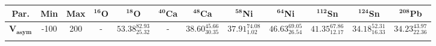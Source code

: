 \bgroup
\def\arraystretch{1.5}%
\begin{tabular}{ c c c c c c c c c c c c} 
\textbf{Par.} & \textbf{Min} & \textbf{Max} & \textbf{$\mathbf{^{16}}$O}& \textbf{$\mathbf{^{18}}$O}& \textbf{$\mathbf{^{40}}$Ca}& \textbf{$\mathbf{^{48}}$Ca}& \textbf{$\mathbf{^{58}}$Ni}& \textbf{$\mathbf{^{64}}$Ni}& \textbf{$\mathbf{^{112}}$Sn}& \textbf{$\mathbf{^{124}}$Sn}& \textbf{$\mathbf{^{208}}$Pb}\\
 \hline 
$\mathbf{V_{asym}}$ & -100 & 200 & - & $53.38^{82.93}_{25.32}$ & - & $38.60^{45.66}_{30.35}$ & $37.91^{74.08}_{1.02}$ & $46.63^{69.05}_{26.54}$ & $41.35^{67.86}_{12.17}$ & $34.18^{52.31}_{16.33}$ & $34.23^{43.97}_{22.36}$\\ 
\\ 
\end{tabular}
\egroup